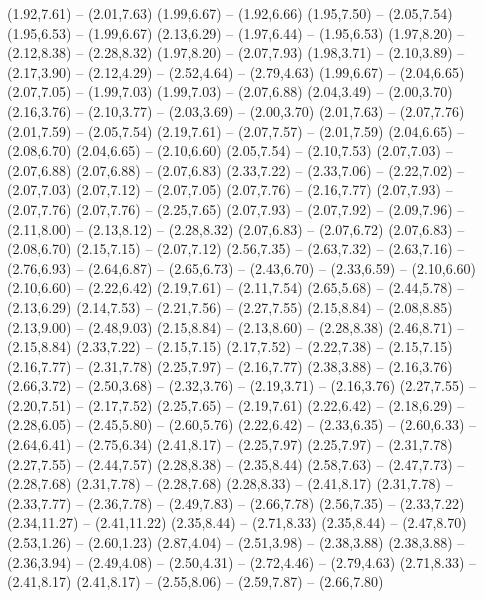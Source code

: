 {  (1.92,7.61) -- (2.01,7.63)
  (1.99,6.67) -- (1.92,6.66)
  (1.95,7.50) -- (2.05,7.54)
  (1.95,6.53) -- (1.99,6.67)
  (2.13,6.29) -- (1.97,6.44) -- (1.95,6.53)
  (1.97,8.20) -- (2.12,8.38) -- (2.28,8.32)
  (1.97,8.20) -- (2.07,7.93)
  (1.98,3.71) -- (2.10,3.89) -- (2.17,3.90) -- (2.12,4.29) -- (2.52,4.64) -- (2.79,4.63)
  (1.99,6.67) -- (2.04,6.65)
  (2.07,7.05) -- (1.99,7.03)
  (1.99,7.03) -- (2.07,6.88)
  (2.04,3.49) -- (2.00,3.70)
  (2.16,3.76) -- (2.10,3.77) -- (2.03,3.69) -- (2.00,3.70)
  (2.01,7.63) -- (2.07,7.76)
  (2.01,7.59) -- (2.05,7.54)
  (2.19,7.61) -- (2.07,7.57) -- (2.01,7.59)
  (2.04,6.65) -- (2.08,6.70)
  (2.04,6.65) -- (2.10,6.60)
  (2.05,7.54) -- (2.10,7.53)
  (2.07,7.03) -- (2.07,6.88)
  (2.07,6.88) -- (2.07,6.83)
  (2.33,7.22) -- (2.33,7.06) -- (2.22,7.02) -- (2.07,7.03)
  (2.07,7.12) -- (2.07,7.05)
  (2.07,7.76) -- (2.16,7.77)
  (2.07,7.93) -- (2.07,7.76)
  (2.07,7.76) -- (2.25,7.65)
  (2.07,7.93) -- (2.07,7.92) -- (2.09,7.96) -- (2.11,8.00) -- (2.13,8.12) -- (2.28,8.32)
  (2.07,6.83) -- (2.07,6.72)
  (2.07,6.83) -- (2.08,6.70)
  (2.15,7.15) -- (2.07,7.12)
  (2.56,7.35) -- (2.63,7.32) -- (2.63,7.16) -- (2.76,6.93) -- (2.64,6.87) -- (2.65,6.73) -- (2.43,6.70) -- (2.33,6.59) -- (2.10,6.60)
  (2.10,6.60) -- (2.22,6.42)
  (2.19,7.61) -- (2.11,7.54)
  (2.65,5.68) -- (2.44,5.78) -- (2.13,6.29)
  (2.14,7.53) -- (2.21,7.56) -- (2.27,7.55)
  (2.15,8.84) -- (2.08,8.85)
  (2.13,9.00) -- (2.48,9.03)
  (2.15,8.84) -- (2.13,8.60) -- (2.28,8.38)
  (2.46,8.71) -- (2.15,8.84)
  (2.33,7.22) -- (2.15,7.15)
  (2.17,7.52) -- (2.22,7.38) -- (2.15,7.15)
  (2.16,7.77) -- (2.31,7.78)
  (2.25,7.97) -- (2.16,7.77)
  (2.38,3.88) -- (2.16,3.76)
  (2.66,3.72) -- (2.50,3.68) -- (2.32,3.76) -- (2.19,3.71) -- (2.16,3.76)
  (2.27,7.55) -- (2.20,7.51) -- (2.17,7.52)
  (2.25,7.65) -- (2.19,7.61)
  (2.22,6.42) -- (2.18,6.29) -- (2.28,6.05) -- (2.45,5.80) -- (2.60,5.76)
  (2.22,6.42) -- (2.33,6.35) -- (2.60,6.33) -- (2.64,6.41) -- (2.75,6.34)
  (2.41,8.17) -- (2.25,7.97)
  (2.25,7.97) -- (2.31,7.78)
  (2.27,7.55) -- (2.44,7.57)
  (2.28,8.38) -- (2.35,8.44)
  (2.58,7.63) -- (2.47,7.73) -- (2.28,7.68)
  (2.31,7.78) -- (2.28,7.68)
  (2.28,8.33) -- (2.41,8.17)
  (2.31,7.78) -- (2.33,7.77) -- (2.36,7.78) -- (2.49,7.83) -- (2.66,7.78)
  (2.56,7.35) -- (2.33,7.22)
  (2.34,11.27) -- (2.41,11.22)
  (2.35,8.44) -- (2.71,8.33)
  (2.35,8.44) -- (2.47,8.70)
  (2.53,1.26) -- (2.60,1.23)
  (2.87,4.04) -- (2.51,3.98) -- (2.38,3.88)
  (2.38,3.88) -- (2.36,3.94) -- (2.49,4.08) -- (2.50,4.31) -- (2.72,4.46) -- (2.79,4.63)
  (2.71,8.33) -- (2.41,8.17)
  (2.41,8.17) -- (2.55,8.06) -- (2.59,7.87) -- (2.66,7.80)
}
